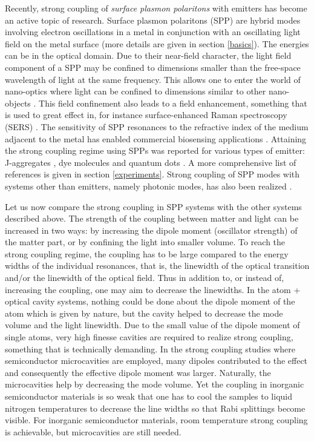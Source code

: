 \documentclass[12pt]{iopart}
\begin{document}
Recently, strong coupling of {\it surface plasmon polaritons} with emitters has become an active topic of research. Surface plasmon polaritons (SPP) are hybrid modes involving electron oscillations in a metal in conjunction with an oscillating light field on the metal surface (more details are given in section \ref{basics}). The energies can be in the optical domain. Due to their near-field character, the light field component of a SPP may be confined to dimensions smaller than the free-space wavelength of light at the same frequency. This allows one to enter the world of nano-optics where light can be confined to dimensions similar to other nano-objects \cite{Gramotnev_NatPhot_2010_4_83,Gramotnev_NatPhot_2014_8_13}. This field confinement also leads to a field enhancement, something that is used to great effect in, for instance surface-enhanced Raman spectroscopy (SERS) \cite{LRandE}. The sensitivity of SPP resonances to the  refractive index of the medium adjacent to the metal has enabled commercial biosensing applications \cite{Rich_JMolRec_2011_24_892}. Attaining the strong coupling regime using SPPs was reported for various types of emitter: J-aggregates \cite{Bellessa2004,Dintinger2005,Dintinger2006,Sugawara2006,Wurtz2007,Chovan2008,Fofang2008,Bellessa2009}, dye molecules \cite{Pockrand1978,Hakala2009,Vakevainen2013} and quantum dots \cite{Gomez2010a,Gomez2010b}. A more comprehensive list of references is given in section \ref{experiments}. Strong coupling of SPP modes with systems other than emitters, namely photonic modes, has also been realized \cite{Ameling2010}. 

Let us now compare the strong coupling in SPP systems with the other systems described above. The strength of the coupling between matter and light can be increased in two ways: by increasing the dipole moment (oscillator strength) of the matter part, or by confining the light into smaller volume. To reach the strong coupling regime, the coupling has to be large compared to the energy widths of the individual resonances, that is, the linewidth of the optical transition and/or the linewidth of the optical field. Thus in addition to, or instead of, increasing the coupling, one may aim to decrease the linewidths. In the atom + optical cavity systems, nothing could be done about the dipole moment of the atom which is given by nature, but the cavity helped to decrease the mode volume and the light linewidth. Due to the small value of the dipole moment of single atoms, very high finesse cavities are required to realize strong coupling, something that is technically demanding. In the strong coupling studies where semiconductor microcavities are employed, many dipoles contributed to the effect and consequently the effective dipole moment was larger. Naturally, the microcavities help by decreasing the mode volume. Yet the coupling in inorganic semiconductor materials is so weak that one has to cool the samples to liquid nitrogen temperatures to decrease the line widths so that Rabi splittings become visible. For inorganic semiconductor materials, room temperature strong coupling is achievable, but microcavities are still needed.
\end{document}
